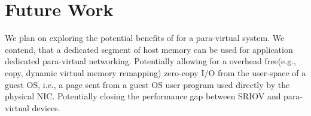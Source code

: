 
\section{Future Work}


We plan on exploring the potential benefits of \oursys for a para-virtual system. We contend, that a dedicated segment of host memory can be used for application dedicated para-virtual networking. Potentially allowing for a overhead free(e.g., copy, dynamic virtual memory remapping) zero-copy I/O from the user-space of a guest OS, i.e., a \oursys page sent from a guest OS user program used directly by the physical NIC. Potentially closing the performance gap between SRIOV and para-virtual devices.



